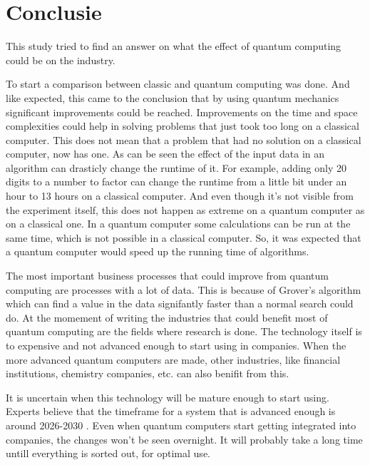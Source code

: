 
\chapter{Conclusie}
\label{ch:conclusie}


This study tried to find an answer on what the effect of quantum computing could be on the industry.

To start a comparison between classic and quantum computing was done. And like expected, this came to the conclusion that by using quantum mechanics significant improvements could be reached.
Improvements on the time and space complexities could help in solving problems that just took too long on a classical computer. This does not mean that a problem that had no solution on a classical computer, now has one.
As can be seen the effect of the input data in an algorithm can drasticly change the runtime of it. For example, adding only 20 digits to a number to factor can change the runtime from a little bit under an hour to 13 hours on a classical computer.
And even though it's not visible from the experiment itself, this does not happen as extreme on a quantum computer as on a classical one.
In a quantum computer some calculations can be run at the same time, which is not possible in a classical computer. So, it was expected that a quantum computer would speed up the running time of algorithms.

The most important business processes that could improve from quantum computing are processes with a lot of data. This is because of Grover's algorithm which can find a value in the data signifantly faster than a normal search could do.
At the momement of writing the industries that could benefit most of quantum computing are the fields where research is done. The technology itself is to expensive and not advanced enough to start using in companies.
When the more advanced quantum computers are made, other industries, like financial institutions, chemistry companies, etc. can also benifit from this.

It is uncertain when this technology will be mature enough to start using. Experts believe that the timeframe for a system that is advanced enough is around 2026-2030 \autocite{timeframe}.
Even when quantum computers start getting integrated into companies, the changes won't be seen overnight. It will probably take a long time untill everything is sorted out, for optimal use.

